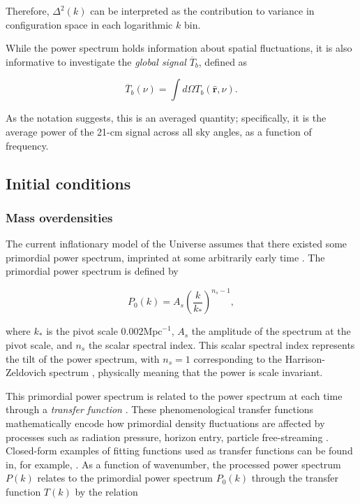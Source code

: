 \documentclass[floats,floatfix,showpacs,amssymb,prd,superscriptaddress,nofootinbib]{revtex4-2} %
\newcommand{\red}{\textcolor{red}}
\begin{document}
\noindent Therefore, $\Delta^2 (k)$ can be interpreted as the contribution to variance in configuration space in each logarithmic $k$ bin.

While the power spectrum holds information about spatial fluctuations, it is also informative to investigate the \textit{global signal} $\overline{T}_b$, defined as 

\begin{equation}
    \overline{T}_b (\nu) = \int d\Omega T_b (\hat{\textbf{r}}, \nu).
\end{equation}

\noindent As the notation suggests, this is an averaged quantity; specifically, it is the average power of the 21-cm signal across all sky angles, as a function of frequency.


\subsection{Initial conditions}
\subsubsection{Mass overdensities}
The current inflationary model of the Universe assumes that there existed some primordial power spectrum, imprinted at some arbitrarily early time \citep{Coles_2001}. The primordial power spectrum is defined by 

\begin{equation}
    P_0 (k) = A_s \left( \frac{k}{k_*} \right)^{n_s - 1},
    \label{eq:primordial_power_spectrum}
\end{equation}

\noindent where $k_*$ is the pivot scale $0.002 \text{Mpc}^{-1}$,
$A_s$ the amplitude of the spectrum at the pivot scale, and $n_s$ the scalar spectral index. This scalar spectral index represents the tilt of the power spectrum, with $n_s = 1$ corresponding to the Harrison-Zeldovich spectrum \citep{Harrison_1970, Zeldovich_1972}, physically meaning that the power is scale invariant.

This primordial power spectrum is related to the power spectrum at each time through a \textit{transfer function} \citep{Bardeen_1986}. These phenomenological transfer functions mathematically encode how primordial density fluctuations are affected by processes such as radiation pressure, horizon entry, particle free-streaming \citep{Coles_2001}. Closed-form examples of fitting functions used as transfer functions can be found in, for example, \citet{Bardeen_1986, Eisenstein_Hu_1998}. As a function of wavenumber, the processed power spectrum $P(k)$ relates to the primordial power spectrum $P_0 (k)$ through the transfer function $T(k)$ by the relation
\end{document}
